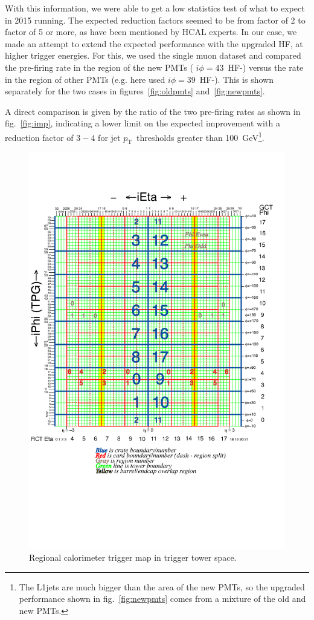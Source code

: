 \documentclass[11pt]{cmspaperpdf}
\newcommand{\pt}{\ensuremath{p_{\textrm{T}}}}
\begin{document}
With this information, we were able to get a low statistics test of what to expect in 2015 running. The expected reduction factors seemed to be from factor of 2 to factor of 5 or more, as have been mentioned by HCAL experts.
In our case, we made an attempt to extend the expected performance with the upgraded HF, at higher trigger energies. For this, we used the single muon dataset and compared the pre-firing rate in the region of the new PMTs ( $i \phi=43$~HF-) versus the rate in the region of other PMTs (e.g. here used  $i \phi=39$~HF-). This is shown separately for the two cases in figures~\ref{fig:oldpmts} and~\ref{fig:newpmts}. 

A direct comparison is given by the ratio of the two pre-firing rates as shown in fig.~\ref{fig:imp}, indicating a lower limit on the expected improvement with a reduction factor of $3-4$ for jet \pt~thresholds greater than 100~GeV\footnote{The L1jets are much bigger than the area of the new PMTs, so the upgraded performance shown in fig.~\ref{fig:newpmts} comes from  a mixture of the old and new PMTs.}.

\begin{figure}
\centering
\includegraphics[scale=0.23]{plots/towers_ieta_iphi_2009.png}
\caption{Regional calorimeter trigger map in trigger tower space.} 
\end{figure}
\vspace{5mm}
\end{document}
